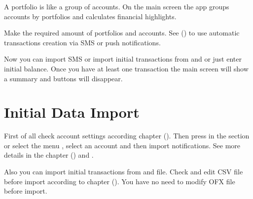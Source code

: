 \documentclass[a4paper,10pt,english]{sphinxmanual}
\begin{document}
\sphinxAtStartPar
A portfolio is like a group of accounts. On the main screen the app groups accounts by portfolios and
calculates financial highlights.

\sphinxAtStartPar
Make the required amount of portfolios and accounts. See {\hyperref[\detokenize{account-identities:chapter-account-identities}]{}} () to use automatic transactions creation
via SMS or push notifications.

\sphinxAtStartPar
Now you can import SMS or import initial transactions from  and  or just enter initial balance.
Once you have at least one transaction the main screen will show a summary and buttons will disappear.


\section{Initial Data Import}
\label{\detokenize{getting-started:initial-data-import}}
\sphinxAtStartPar
First of all check account settings according chapter {\hyperref[\detokenize{account-identities:chapter-account-identities}]{}} (). Then press 
in the  section or select the menu , select an account
and then import notifications. See more details in the chapter {\hyperref[\detokenize{import:chapter-import}]{}} () and .

\sphinxAtStartPar
Also you can import initial transactions from  and  file. Check and edit CSV file before import according to chapter {\hyperref[\detokenize{import:chapter-import}]{}} ().
You have no need to modify OFX file before import.
\end{document}
